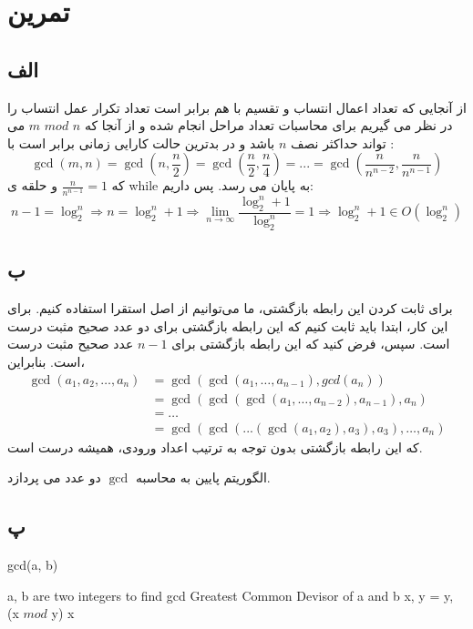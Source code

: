 \documentclass{article}
\begin{document}
\pagebreak

\section{تمرین}
\subsection{الف}
از آنجایی که تعداد اعمال انتساب و تقسیم با هم برابر است تعداد تکرار عمل انتساب را در نظر می گیریم
برای محاسبات تعداد مراحل انجام شده و از آنجا که 
$m \,\, mod \,\, n$
می تواند حداکثر نصف 
$n$
باشد و در بدترین حالت کارایی زمانی برابر است با :
$$\gcd(m, n) = \gcd(n, \frac{n}{2}) = \gcd(\frac{n}{2}, \frac{n}{4}) =... = \gcd(\frac{n}{n^{n-2}}, \frac{n}{n^{n-1}})$$
که 
$\frac{n}{n^{n-1}} = 1$
و حلقه ی
while
به پایان می رسد.
پس داریم:
$$n-1 = \log_2^n \Rightarrow n = \log_2^n + 1 \Rightarrow \lim_{n \rightarrow \infty} \frac{\log_2^n + 1}{\log_2^n} = 1 \Rightarrow \log_2^n + 1 \in O(\log_2^n)$$

\subsection{ب}
برای ثابت کردن این رابطه بازگشتی، ما می‌توانیم از اصل استقرا استفاده کنیم. برای این کار، 
ابتدا باید ثابت کنیم که این رابطه بازگشتی برای دو عدد صحیح مثبت درست است. سپس، فرض کنید که
این رابطه بازگشتی برای 
$n-1$
عدد صحیح مثبت درست است. بنابراین،
\begin{align}
    \gcd(a_1, a_2, \ldots, a_n) &= \gcd(\gcd(a_1, \ldots, a_{n-1}), gcd(a_n)) \\
                            &= \gcd(\gcd(\gcd(a_1, \ldots, a_{n-2}), a_{n-1}), a_n)\\
                            &=\ldots \\
                            &= \gcd(\gcd(...(\gcd(a_1, a_2), a_3), a_3), \ldots, a_{n})
\end{align}
که این رابطه بازگشتی بدون توجه به ترتیب اعداد ورودی، همیشه درست است.

الگوریتم پایین به محاسبه 
$\gcd$
دو عدد می پردازد.

\subsection{پ}
\begin{latin}
    \begin{algorithm}[H]
        \caption{gcd(a, b)}
        \begin{algorithmic}
            \Require a, b are two integers to find gcd
            \Ensure Greatest Common Devisor of a and b
                    \State x, y = y, (x $mod$ y)
                \EndWhile
                \State \Return x
        \end{algorithmic}
    \end{algorithm}
\end{latin}
\end{document}

